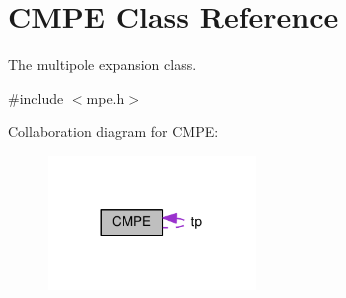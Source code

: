 \hypertarget{classCMPE}{\section{C\-M\-P\-E Class Reference}
\label{classCMPE}
}


The multipole expansion class.  




{\ttfamily \#include $<$mpe.\-h$>$}



Collaboration diagram for C\-M\-P\-E\-:\nopagebreak
\begin{figure}[H]
\begin{center}
\leavevmode
\includegraphics[width=156pt]{classCMPE__coll__graph}
\end{center}
\end{figure}

